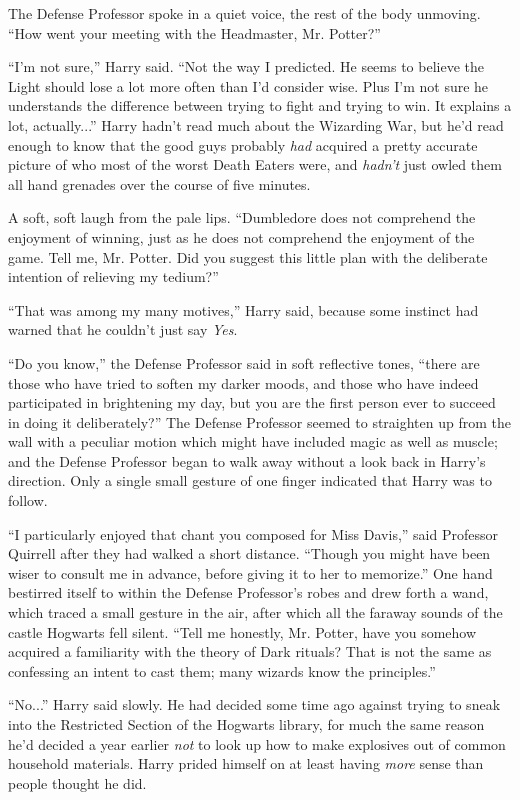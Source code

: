 The Defense Professor spoke in a quiet voice, the rest of the body unmoving. ``How went your meeting with the Headmaster, Mr. Potter?''

``I'm not sure,'' Harry said. ``Not the way I predicted. He seems to believe the Light should lose a lot more often than I'd consider wise. Plus I'm not sure he understands the difference between trying to fight and trying to win. It explains a lot, actually...'' Harry hadn't read much about the Wizarding War, but he'd read enough to know that the good guys probably \emph{had} acquired a pretty accurate picture of who most of the worst Death Eaters were, and \emph{hadn't} just owled them all hand grenades over the course of five minutes.

A soft, soft laugh from the pale lips. ``Dumbledore does not comprehend the enjoyment of winning, just as he does not comprehend the enjoyment of the game. Tell me, Mr. Potter. Did you suggest this little plan with the deliberate intention of relieving my tedium?''

``That was among my many motives,'' Harry said, because some instinct had warned that he couldn't just say \emph{Yes}.

``Do you know,'' the Defense Professor said in soft reflective tones, ``there are those who have tried to soften my darker moods, and those who have indeed participated in brightening my day, but you are the first person ever to succeed in doing it deliberately?'' The Defense Professor seemed to straighten up from the wall with a peculiar motion which might have included magic as well as muscle; and the Defense Professor began to walk away without a look back in Harry's direction. Only a single small gesture of one finger indicated that Harry was to follow.

``I particularly enjoyed that chant you composed for Miss Davis,'' said Professor Quirrell after they had walked a short distance. ``Though you might have been wiser to consult me in advance, before giving it to her to memorize.'' One hand bestirred itself to within the Defense Professor's robes and drew forth a wand, which traced a small gesture in the air, after which all the faraway sounds of the castle Hogwarts fell silent. ``Tell me honestly, Mr. Potter, have you somehow acquired a familiarity with the theory of Dark rituals? That is not the same as confessing an intent to cast them; many wizards know the principles.''

``No...'' Harry said slowly. He had decided some time ago against trying to sneak into the Restricted Section of the Hogwarts library, for much the same reason he'd decided a year earlier \emph{not} to look up how to make explosives out of common household materials. Harry prided himself on at least having \emph{more} sense than people thought he did.

